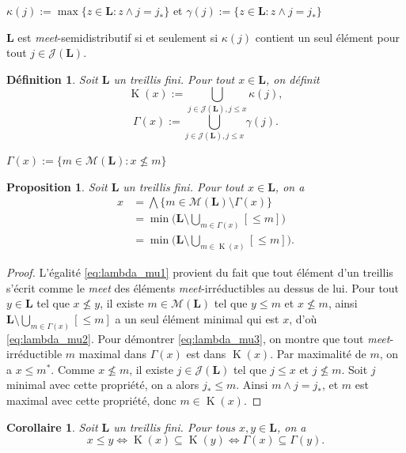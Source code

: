 \documentclass[leqno, 12pt]{amsart}
\numberwithin{equation}{section}
\newtheorem{prop}[thm]{Proposition}
\newtheorem{defi}[thm]{Définition}
\newtheorem{cor}[thm]{Corollaire}
\renewcommand{\L}{\mathbf L}
\newcommand{\JIrr}{\mathcal J}
\newcommand{\MIrr}{\mathcal M}
\newcommand{\Kappa}{\operatorname{K}}
\begin{document}
$\kappa(j):=\max\{z\in \L:z\wedge j=j_*\}$ et $\gamma(j):=\{z\in \L:z\wedge j=j_*\}$

$\L$ est \emph{meet}-semidistributif si et seulement si $\kappa(j)$ contient un seul élément pour tout $j\in \JIrr(\L)$.
\begin{defi}
   Soit $\L$ un treillis fini. Pour tout $x\in \L$, on définit 
   \begin{equation}
        \Kappa(x):=\bigcup_{j\in \JIrr(\L),j\le x}\kappa(j),
   \end{equation}
   \begin{equation}
         \Gamma(x):=\bigcup_{j\in \JIrr(\L),j\le x}\gamma(j).
   \end{equation}
\end{defi}

$\Gamma(x):=\{m\in \MIrr(\L):x\nleq m\}$
\begin{prop}
Soit $\L$ un treillis fini. Pour tout $x\in \L$, on a
  \begin{align}
    \label{eq:lambda_mu1}
      x & = \bigwedge \{m\in \MIrr(\L)\setminus \Gamma(x)\} \\
      \label{eq:lambda_mu2}
      & = \min \big( \L\setminus \bigcup_{m\in \Gamma(x)} [\le m] \big)\\
      \label{eq:lambda_mu3}
      & = \min \big( \L\setminus \bigcup_{m\in \Kappa(x)} [\le m] \big).
  \end{align}
\end{prop}
\begin{proof}
L'égalité \eqref{eq:lambda_mu1} provient du fait que tout élément d'un treillis s'écrit comme le \emph{meet} des éléments \emph{meet}-irréductibles au dessus de lui. Pour tout $y\in \L$ tel que $x\nleq y$, il existe $m\in \MIrr(\L)$ tel que $y\le m$ et $x\nleq m$, ainsi $\L\setminus \bigcup_{m\in \Gamma(x)} [\le m]$ a un seul élément minimal qui est $x$, d'où \eqref{eq:lambda_mu2}. Pour démontrer \eqref{eq:lambda_mu3}, on montre que tout \emph{meet}-irréductible $m$ maximal dans $\Gamma(x)$ est dans $\Kappa(x)$. Par maximalité de $m$, on a $x\le m^*$. Comme $x\nleq m$, il existe $j\in \JIrr(\L)$ tel que $j\le x$ et $j\nleq m$. Soit $j$ minimal avec cette propriété, on a alors $j_*\le m$. Ainsi $m\wedge j=j_*$, et $m$ est maximal avec cette propriété, donc $m\in \Kappa(x)$.
\end{proof}

\begin{cor}
   Soit $\L$ un treillis fini. Pour tous $x,y\in \L$, on a 
   \begin{equation}
       x\le y \iff \Kappa(x)\subseteq \Kappa(y) \iff \Gamma(x) \subseteq \Gamma(y).
   \end{equation}
\end{cor}
\end{document}
